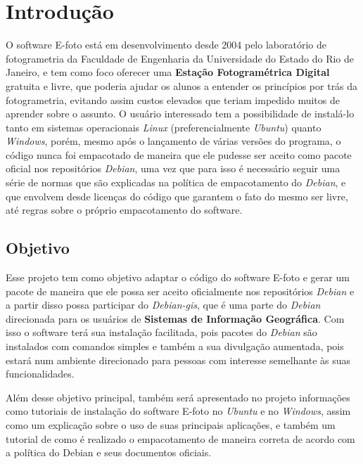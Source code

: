 \chapter*{Introdução}

O software E-foto está em desenvolvimento desde 2004 pelo laboratório de fotogrametria da Faculdade de Engenharia da Universidade do Estado do Rio de Janeiro, e tem como foco oferecer uma \textbf{Estação Fotogramétrica Digital} gratuita e livre, que poderia ajudar os alunos a entender os princípios por trás da fotogrametria, evitando assim custos elevados que teriam impedido muitos de aprender sobre o assunto. O usuário interessado tem a possibilidade de instalá-lo tanto em sistemas operacionais \textit{Linux} (preferencialmente \textit{Ubuntu}) quanto \textit{Windows}, porém, mesmo após o lançamento de várias versões do programa, o código nunca foi empacotado de maneira que ele pudesse ser aceito como pacote oficial nos repositórios \textit{Debian}, uma vez que para isso é necessário seguir uma série de normas que são explicadas na política de empacotamento do \textit{Debian}, e que envolvem desde licenças do código que garantem o fato do mesmo ser livre, até regras sobre o próprio empacotamento do software.

\section*{Objetivo}

Esse projeto tem como objetivo adaptar o código do software E-foto e gerar um pacote  de maneira que ele possa ser aceito oficialmente nos repositórios \textit{Debian} e a partir disso possa participar do \textit{Debian-gis}, que é uma parte do \textit{Debian} direcionada para os usuários de \textbf{Sistemas de Informação Geográfica}. Com isso o software terá sua instalação facilitada, pois pacotes do \textit{Debian} são instalados com comandos simples e também a sua divulgação aumentada, pois estará num ambiente direcionado para pessoas com interesse semelhante às suas funcionalidades. 

Além desse objetivo principal, também será apresentado no projeto informações como tutoriais de instalação do software E-foto no \textit{Ubuntu} e no \textit{Windows}, assim como um explicação sobre o uso de suas principais aplicações, e também um tutorial de como é realizado o empacotamento de maneira correta de acordo com a política do Debian e seus documentos oficiais.

